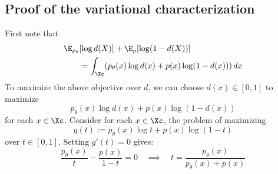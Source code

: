 \subsection{Proof of the variational characterization}
First note that
\begin{align*}
    \E_{p_\theta} & [\log d(X)] + \E_p[\log(1-d(X))]                                  \\
                  & = \int_{\Xc} (p_\theta(x) \log d(x) + p(x) \log (1 - d(x))) \, dx
\end{align*}
To maximize the above objective over $d$, we can choose $d(x) \in [0,1]$ to maximize
\[
    p_\theta(x) \log d(x) + p(x) \log (1 - d(x))
\]
for each $x \in \Xc$. Consider for each $x \in \Xc$, the problem of maximizing
\[
    g(t) := p_\theta(x) \log t + p(x) \log (1 - t)
\]
over $t \in [0,1]$. Setting $g'(t) = 0$ gives:
\[
    \frac{p_\theta(x)}{t} - \frac{p(x)}{1-t} = 0 \quad\implies\quad t = \frac{p_\theta(x)}{p_\theta(x) + p(x)}
\]


